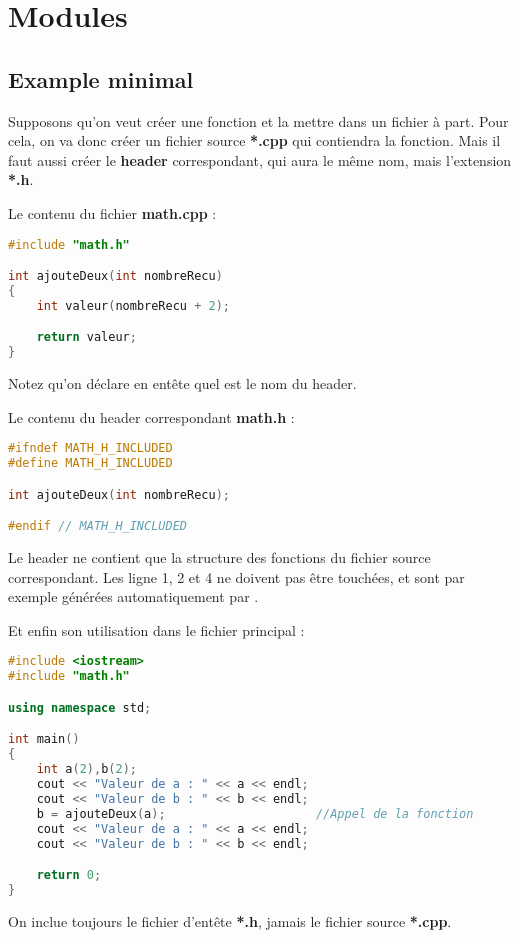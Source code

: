 \documentclass[a4paper,twoside]{article}
\begin{document}
\section{Modules}
\subsection{Example minimal}
Supposons qu'on veut créer une fonction et la mettre dans un fichier à part. Pour cela, on va donc créer un fichier source 
\textbf{*.cpp} qui contiendra la fonction. Mais il faut aussi créer le \textbf{header} correspondant, qui aura le même nom, 
mais l'extension \textbf{*.h}. 

Le contenu du fichier \textbf{math.cpp} :
\begin{lstlisting}[language=C++]
#include "math.h"

int ajouteDeux(int nombreRecu)
{
    int valeur(nombreRecu + 2);

    return valeur;
}
\end{lstlisting}
Notez qu'on déclare en entête quel est le nom du header. 

Le contenu du header correspondant \textbf{math.h} :
\begin{lstlisting}[language=C++]
#ifndef MATH_H_INCLUDED
#define MATH_H_INCLUDED

int ajouteDeux(int nombreRecu);

#endif // MATH_H_INCLUDED
\end{lstlisting}
Le header ne contient que la structure des fonctions du fichier source correspondant. Les ligne 1, 2 et 4 ne doivent pas être 
touchées, et sont par exemple générées automatiquement par .

Et enfin son utilisation dans le fichier principal :
\begin{lstlisting}[language=C++]
#include <iostream>
#include "math.h"

using namespace std;

int main()
{
    int a(2),b(2);
    cout << "Valeur de a : " << a << endl;
    cout << "Valeur de b : " << b << endl;
    b = ajouteDeux(a);                     //Appel de la fonction
    cout << "Valeur de a : " << a << endl;
    cout << "Valeur de b : " << b << endl;

    return 0;
}
\end{lstlisting}

\begin{attention}
On inclue toujours le fichier d'entête \textbf{*.h}, jamais le fichier source \textbf{*.cpp}.
\end{attention}
\end{document}
